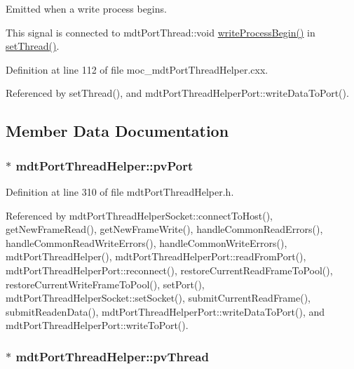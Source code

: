 Emitted when a write process begins. 

This signal is connected to mdt\-Port\-Thread\-::void \hyperlink{classmdt_port_thread_helper_a80df5929776f6c617b96f2184e2bc96d}{write\-Process\-Begin()} in \hyperlink{classmdt_port_thread_helper_af6c9d2cb2e9e922942236068bf634b0b}{set\-Thread()}. 

Definition at line 112 of file moc\-\_\-mdt\-Port\-Thread\-Helper.\-cxx.



Referenced by set\-Thread(), and mdt\-Port\-Thread\-Helper\-Port\-::write\-Data\-To\-Port().



\subsection{Member Data Documentation}
\hypertarget{classmdt_port_thread_helper_ada4497db38cb418c2021aecaf4caa36c}{
\subsubsection[{pv\-Port}]{$\ast$ mdt\-Port\-Thread\-Helper\-::pv\-Port\hspace{0.3cm}{\ttfamily [protected]}}}\label{classmdt_port_thread_helper_ada4497db38cb418c2021aecaf4caa36c}


Definition at line 310 of file mdt\-Port\-Thread\-Helper.\-h.



Referenced by mdt\-Port\-Thread\-Helper\-Socket\-::connect\-To\-Host(), get\-New\-Frame\-Read(), get\-New\-Frame\-Write(), handle\-Common\-Read\-Errors(), handle\-Common\-Read\-Write\-Errors(), handle\-Common\-Write\-Errors(), mdt\-Port\-Thread\-Helper(), mdt\-Port\-Thread\-Helper\-Port\-::read\-From\-Port(), mdt\-Port\-Thread\-Helper\-Port\-::reconnect(), restore\-Current\-Read\-Frame\-To\-Pool(), restore\-Current\-Write\-Frame\-To\-Pool(), set\-Port(), mdt\-Port\-Thread\-Helper\-Socket\-::set\-Socket(), submit\-Current\-Read\-Frame(), submit\-Readen\-Data(), mdt\-Port\-Thread\-Helper\-Port\-::write\-Data\-To\-Port(), and mdt\-Port\-Thread\-Helper\-Port\-::write\-To\-Port().

\hypertarget{classmdt_port_thread_helper_a44780de0f664de18ca999ef43321c525}{
\subsubsection[{pv\-Thread}]{$\ast$ mdt\-Port\-Thread\-Helper\-::pv\-Thread\hspace{0.3cm}{\ttfamily [protected]}}}\label{classmdt_port_thread_helper_a44780de0f664de18ca999ef43321c525}


